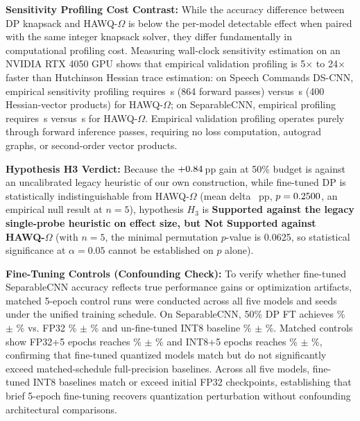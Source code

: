 \documentclass{ieeeaccess}
\begin{document}
\textbf{Sensitivity Profiling Cost Contrast:} While the accuracy difference between DP knapsack and HAWQ-$\Omega$ is below the per-model detectable effect when paired with the same integer knapsack solver, they differ fundamentally in computational profiling cost. Measuring wall-clock sensitivity estimation on an NVIDIA RTX 4050 GPU shows that empirical validation profiling is 5$\times$ to 24$\times$ faster than Hutchinson Hessian trace estimation: on Speech Commands DS-CNN, empirical sensitivity profiling requires \MacroCostSpeechDPTime\,s (864 forward passes) versus \MacroCostSpeechOmegaTime\,s (400 Hessian-vector products) for HAWQ-$\Omega$; on SeparableCNN, empirical profiling requires \MacroCostSepCNNDPTime\,s versus \MacroCostSepCNNOmegaTime\,s for HAWQ-$\Omega$. Empirical validation profiling operates purely through forward inference passes, requiring no loss computation, autograd graphs, or second-order vector products.

\textbf{Hypothesis H3 Verdict:} Because the $+ 0.84\,$pp gain at 50\% budget is against an uncalibrated legacy heuristic of our own construction, while fine-tuned DP is statistically indistinguishable from HAWQ-$\Omega$ (mean delta \MacroOmegaMeanDelta\ pp, $p = 0.2500$, an empirical null result at $n = 5$), hypothesis $H_3$ is \textbf{Supported against the legacy single-probe heuristic on effect size, but Not Supported against HAWQ-$\Omega$} (with $n = 5$, the minimal permutation $p$-value is 0.0625, so statistical significance at $\alpha = 0.05$ cannot be established on $p$ alone).

\textbf{Fine-Tuning Controls (Confounding Check):} To verify whether fine-tuned SeparableCNN accuracy reflects true performance gains or optimization artifacts, matched 5-epoch control runs were conducted across all five models and seeds under the unified training schedule. On SeparableCNN, 50\% DP FT achieves \MacroSepCNNDPFiveMean\% $\pm$ \MacroSepCNNDPFiveStd\% vs. FP32 \MacroSepCNNFPThirtyTwoMean\% $\pm$ \MacroSepCNNFPThirtyTwoStd\% and un-fine-tuned INT8 baseline \MacroSepCNNINTEightBaselineMean\% $\pm$ \MacroSepCNNINTEightBaselineStd\%. Matched controls show FP32+5 epochs reaches \MacroSepCNNFPThirtyTwoFTFiveMean\% $\pm$ \MacroSepCNNFPThirtyTwoFTFiveStd\% and INT8+5 epochs reaches \MacroSepCNNINTEightFTFiveMean\% $\pm$ \MacroSepCNNINTEightFTFiveStd\%, confirming that fine-tuned quantized models match but do not significantly exceed matched-schedule full-precision baselines. Across all five models, fine-tuned INT8 baselines match or exceed initial FP32 checkpoints, establishing that brief 5-epoch fine-tuning recovers quantization perturbation without confounding architectural comparisons.
\end{document}
